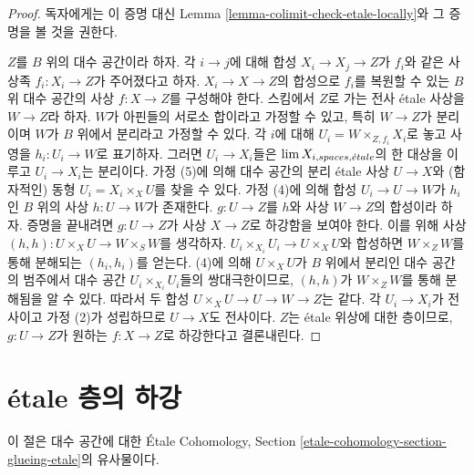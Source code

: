 \begin{proof}
독자에게는 이 증명 대신 Lemma
\ref{lemma-colimit-check-etale-locally}와 그 증명을 볼 것을 권한다.

\medskip\noindent
$Z$를 $B$ 위의 대수 공간이라 하자. 각 $i \to j$에 대해
합성 $X_i \to X_j \to Z$가 $f_i$와 같은
사상족 $f_i : X_i \to Z$가 주어졌다고 하자.
$X_i \to X \to Z$의 합성으로 $f_i$를 복원할 수 있는
$B$ 위 대수 공간의 사상 $f : X \to Z$를 구성해야 한다.
스킴에서 $Z$로 가는 전사 \'etale 사상을 $W \to Z$라 하자.
$W$가 아핀들의 서로소 합이라고 가정할 수 있고,
특히 $W \to Z$가 분리이며 $W$가 $B$ 위에서 분리라고 가정할 수 있다.
각 $i$에 대해 $U_i = W \times_{Z, f_i} X_i$로 놓고
사영을 $h_i : U_i \to W$로 표기하자.
그러면 $U_i \to X_i$들은 $\mathop{\mathrm{lim}}\nolimits X_{i, spaces, {\acute{e}tale}}$의
한 대상을 이루고 $U_i \to X_i$는 분리이다.
가정 (5)에 의해 대수 공간의 분리 \'etale 사상 $U \to X$와
(함자적인) 동형 $U_i = X_i \times_X U$를 찾을 수 있다.
가정 (4)에 의해 합성 $U_i \to U \to W$가 $h_i$인
$B$ 위의 사상 $h : U \to W$가 존재한다.
$g : U \to Z$를 $h$와 사상 $W \to Z$의 합성이라 하자.
증명을 끝내려면 $g : U \to Z$가 사상 $X \to Z$로 하강함을
보여야 한다. 이를 위해 사상
$(h, h) : U \times_X U \to W \times_S W$를 생각하자.
$U_i \times_{X_i} U_i \to U \times_X U$와 합성하면
$W \times_Z W$를 통해 분해되는 $(h_i, h_i)$를 얻는다.
(4)에 의해 $U \times_X U$가 $B$ 위에서 분리인 대수 공간의
범주에서 대수 공간 $U_i \times_{X_i} U_i$들의 쌍대극한이므로,
$(h, h)$가 $W \times_Z W$를 통해 분해됨을 알 수 있다.
따라서 두 합성 $U \times_X U \to U \to W \to Z$는 같다.
각 $U_i \to X_i$가 전사이고 가정 (2)가 성립하므로
$U \to X$도 전사이다. $Z$는 \'etale 위상에 대한 층이므로,
$g : U \to Z$가 원하는 $f : X \to Z$로 하강한다고 결론내린다.
\end{proof}

\section{\'etale 층의 하강}
\label{section-glueing-etale}

\noindent
이 절은 대수 공간에 대한
\'Etale Cohomology, Section \ref{etale-cohomology-section-glueing-etale}의
유사물이다.

